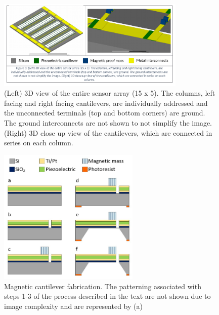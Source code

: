 \begin{figure}
\centering
\includegraphics[width=0.8\textwidth]{yoon_3d}
\caption{(Left) 3D view of the entire sensor array (15 x 5). The columns, left facing and right facing cantilevers, are individually addressed and the unconnected terminals (top and bottom corners) are ground. The ground interconnects are not shown to not simplify the image. (Right) 3D close up view of the cantilevers, which are connected in series on each column.}
\label{fig:yoon_3d}
\end{figure}

\begin{figure}
\centering
\includegraphics[width=0.6\textwidth]{yoon_process}
\caption{Magnetic cantilever fabrication. The patterning associated with steps 1-3 of the process described in the text are not
shown due to image complexity and are represented by (a)}
\label{fig:yoon_process}
\end{figure}

